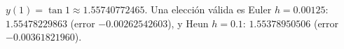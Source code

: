 $y(1)=\tan1\approx1.55740772465$. Una elección válida es Euler $h=0.00125$: $1.55478229863$ (error $-0.00262542603$), y Heun $h=0.1$: $1.55378950506$ (error $-0.00361821960$).
